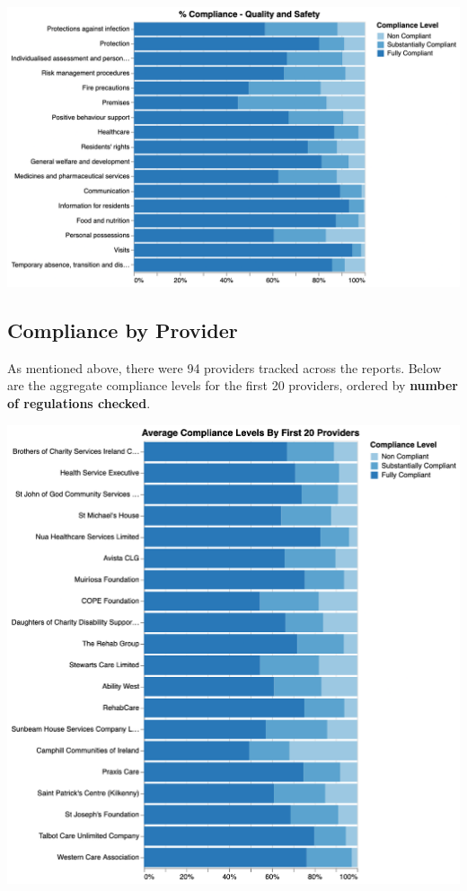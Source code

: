 \documentclass[a4paper,11pt,twoside]{article}
\begin{document}
\begin{center}
\includegraphics[width=.9\linewidth]{img/09_compliance_quality.png}
\end{center}
\subsection{Compliance by Provider}
\label{sec:orge2a28f1}
As mentioned above, there were 94 providers tracked across the reports. Below are the aggregate compliance levels for the first 20 providers, ordered by \textbf{number of regulations checked}.

\begin{center}
\includegraphics[width=.9\linewidth]{img/10_compliance_providers.png}
\end{center}
\end{document}
